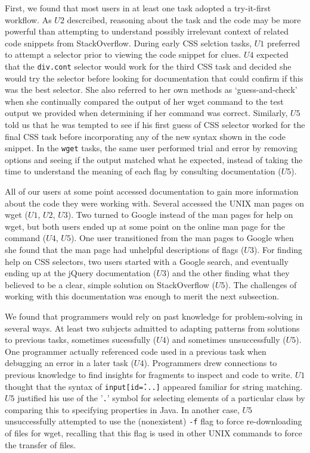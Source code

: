 First, we found that most users in at least one task adopted a try-it-first workflow.
As $U2$ descrcibed, reasoning about the task and the code may be more powerful than attempting to understand possibly irrelevant context of related code snippets from StackOverflow.
During early CSS selction tasks, $U1$ preferred to attempt a selector prior to viewing the code snippet for clues.
$U4$ expected that the \texttt{div.cont} selector would work for the third CSS task and decided she would try the selector before looking for documentation that could confirm if this was the best selector.
She also referred to her own methods as `guess-and-check' when she continually compared the output of her wget command to the test output we provided when determining if her command was correct.
Similarly, $U5$ told us that he was tempted to see if his first guess of CSS selector worked for the final CSS task before incorporating any of the new syntax shown in the code snippet.
In the \texttt{wget} tasks, the same user performed trial and error by removing options and seeing if the output matched what he expected, instead of taking the time to understand the meaning of each flag by consulting documentation ($U5$).

All of our users at some point accessed documentation to gain more information about the code they were working with.
Several accessed the UNIX man pages on wget ($U1$, $U2$, $U3$).
Two turned to Google instead of the man pages for help on wget, but both users ended up at some point on the online man page for the command ($U4$, $U5$).
One user transitioned from the man pages to Google when she found that the man page had unhelpful descriptions of flags ($U3$).
For finding help on CSS selectors, two users started with a Google search, and eventually ending up at the jQuery documentation ($U3$) and the other finding what they believed to be a clear, simple solution on StackOverflow ($U5$).
The challenges of working with this documentation was enough to merit the next subsection.

We found that programmers would rely on past knowledge for problem-solving in several ways.
At least two subjects admitted to adapting patterns from solutions to previous tasks, sometimes sucessfully ($U4$) and sometimes unsuccessfully ($U5$).
One programmer actually referenced code used in a previous task when debugging an error in a later task ($U4$).
Programmers drew connections to previous knowledge to find insights for fragments to inspect and code to write.
$U1$ thought that the syntax of \texttt{input[id\^=...]} appeared familiar for string matching.
$U5$ justified his use of the '\texttt{.}' symbol for selecting elements of a particular class by comparing this to specifying properties in Java.
In another case, $U5$ unsuccessfully attempted to use the (nonexistent) \texttt{-f} flag to force re-downloading of files for wget, recalling that this flag is used in other UNIX commands to force the transfer of files.

